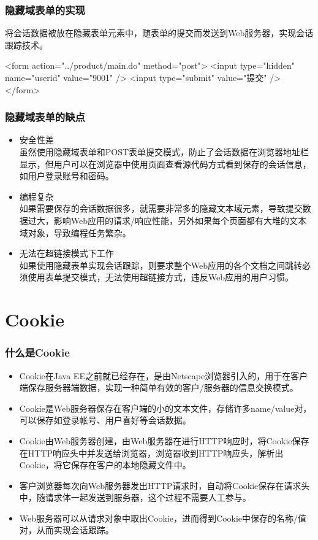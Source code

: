 \begin{frame}[fragile] %
\frametitle{隐藏域表单的实现} 

将会话数据被放在隐藏表单元素中，随表单的提交而发送到Web服务器，实现会话跟踪技术。 


\begin{xmlCode}
<form action="../product/main.do" method="post">
  <input type="hidden" name="userid" value="9001" />
  <input type="submit" value="提交" />
</form>  
\end{xmlCode}
\end{frame}

\begin{frame}[fragile] %
\frametitle{隐藏域表单的缺点} 
\begin{itemize}
\item 安全性差\\
虽然使用隐藏域表单和POST表单提交模式，防止了会话数据在浏览器地址栏显示，但用户可以在浏览器中使用页面查看源代码方式看到保存的会话信息，如用户登录账号和密码。
\item 编程复杂\\
如果需要保存的会话数据很多，就需要非常多的隐藏文本域元素，导致提交数据过大，影响Web应用的请求/响应性能，另外如果每个页面都有大堆的文本域对象，导致编程任务繁杂。
\item 无法在超链接模式下工作\\
如果使用隐藏表单实现会话跟踪，则要求整个Web应用的各个文档之间跳转必须使用表单提交模式，无法使用超链接方式，违反Web应用的用户习惯。
\end{itemize}
\end{frame}

\section{Cookie}

\begin{frame}[fragile] %
\frametitle{什么是Cookie} 

\begin{itemize}\kai\small
\item Cookie在Java EE之前就已经存在，是由Netscape浏览器引入的，用于在客户端保存服务器端数据，实现一种简单有效的客户/服务器的信息交换模式。
\item Cookie是Web服务器保存在客户端的小的文本文件，存储许多name/value对，可以保存如登录帐号、用户喜好等会话数据。
\item Cookie由Web服务器创建，由Web服务器在进行HTTP响应时，将Cookie保存在HTTP响应头中并发送给浏览器，浏览器收到HTTP响应头，解析出Cookie，将它保存在客户的本地隐藏文件中。
\item 客户浏览器每次向Web服务器发出HTTP请求时，自动将Cookie保存在请求头中，随请求体一起发送到服务器，这个过程不需要人工参与。
\item Web服务器可以从请求对象中取出Cookie，进而得到Cookie中保存的名称/值对，从而实现会话跟踪。
\end{itemize}
\end{frame}

